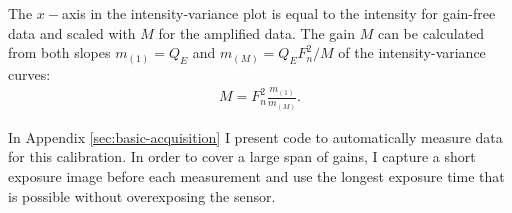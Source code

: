 The $x-$axis in the intensity-variance plot is equal to the intensity
for gain-free data and scaled with $M$ for the amplified data.  The
gain $M$ can be calculated from both slopes $m_{(1)}=Q_E$ and $
m_{(M)}=Q_E F_n^2/M$ of the intensity-variance curves:
\begin{align}
  M = F_n^2 \frac{m_{(1)}}{m_{(M)}}.
\end{align}

In Appendix \ref{sec:basic-acquisition} I present code to
automatically measure data for this calibration. In order to cover a
large span of gains, I capture a short exposure image before each
measurement and use the longest exposure time that is possible without
overexposing the sensor.

























